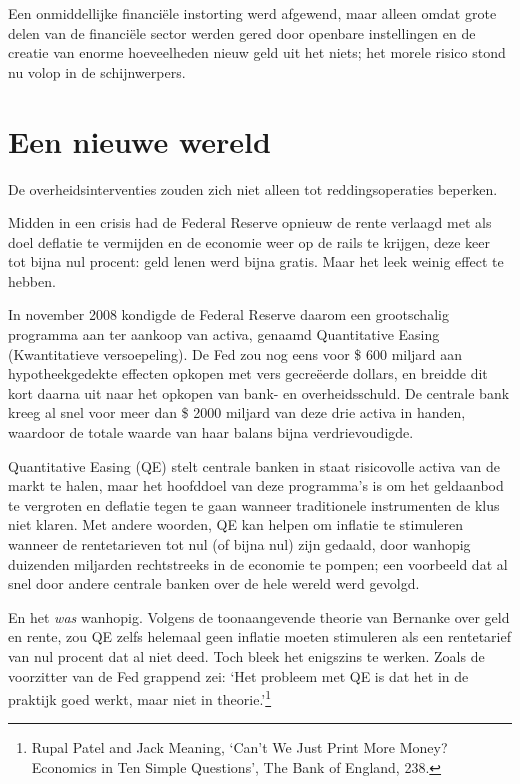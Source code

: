 \documentclass[smalldemyvopaper,11pt,twoside,onecolumn,openright,extrafontsizes,hidelinks]{memoir}
\begin{document}
Een onmiddellijke financiële instorting werd afgewend, maar alleen omdat
grote delen van de financiële sector werden gered door openbare
instellingen en de creatie van enorme hoeveelheden nieuw geld uit het
niets; het morele risico stond nu volop in de schijnwerpers.

\section{Een nieuwe wereld}\label{een-nieuwe-wereld}

De overheidsinterventies zouden zich niet alleen tot reddingsoperaties
beperken.

Midden in een crisis had de Federal Reserve opnieuw de rente verlaagd
met als doel deflatie te vermijden en de economie weer op de rails te
krijgen, deze keer tot bijna nul procent: geld lenen werd bijna gratis.
Maar het leek weinig effect te hebben.

In november 2008 kondigde de Federal Reserve daarom een grootschalig
programma aan ter aankoop van activa, genaamd Quantitative Easing
(Kwantitatieve versoepeling). De Fed zou nog eens voor \$ 600 miljard
aan hypotheekgedekte effecten opkopen met vers gecreëerde dollars, en
breidde dit kort daarna uit naar het opkopen van bank- en
overheidsschuld. De centrale bank kreeg al snel voor meer dan \$ 2000
miljard van deze drie activa in handen, waardoor de totale waarde van
haar balans bijna verdrievoudigde.

Quantitative Easing (QE) stelt centrale banken in staat risicovolle
activa van de markt te halen, maar het hoofddoel van deze programma's is
om het geldaanbod te vergroten en deflatie tegen te gaan wanneer
traditionele instrumenten de klus niet klaren. Met andere woorden, QE
kan helpen om inflatie te stimuleren wanneer de rentetarieven tot nul
(of bijna nul) zijn gedaald, door wanhopig duizenden miljarden
rechtstreeks in de economie te pompen; een voorbeeld dat al snel door
andere centrale banken over de hele wereld werd gevolgd.

En het \emph{was} wanhopig. Volgens de toonaangevende theorie van
Bernanke over geld en rente, zou QE zelfs helemaal geen inflatie moeten
stimuleren als een rentetarief van nul procent dat al niet deed. Toch
bleek het enigszins te werken. Zoals de voorzitter van de Fed grappend
zei: `Het probleem met QE is dat het in de praktijk goed werkt, maar
niet in theorie.'\footnote{Rupal Patel and Jack Meaning, `Can't We Just
  Print More Money? Economics in Ten Simple Questions', The Bank of
  England, 238.}
\end{document}
